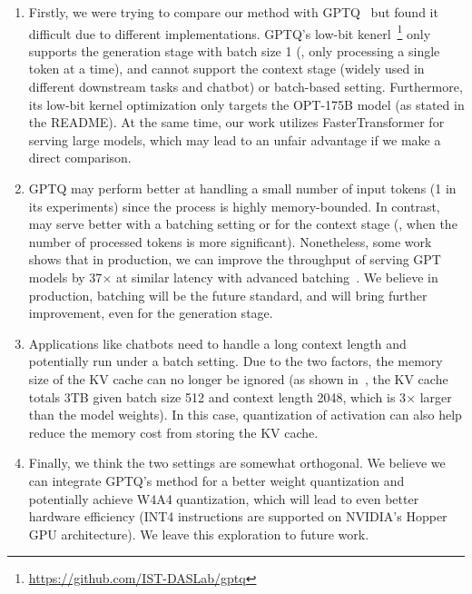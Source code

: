 \begin{enumerate}
    \item Firstly, we were trying to compare our method with GPTQ~\cite{frantar2022gptq} but found it difficult due to different implementations. GPTQ's low-bit kenerl~\footnote{\url{https://github.com/IST-DASLab/gptq}} only supports the generation stage with batch size 1 (\ie, only processing a single token at a time), and cannot support the context stage (widely used in different downstream tasks and chatbot) or batch-based setting. Furthermore, its low-bit kernel optimization only targets the OPT-175B model (as stated in the README). At the same time, our work utilizes FasterTransformer for serving large models, which may lead to an unfair advantage if we make a direct comparison.
    \item GPTQ may perform better at handling a small number of input tokens (1 in its experiments) since the process is highly memory-bounded. In contrast, \method may serve better with a batching setting or for the context stage (\ie, when the number of processed tokens is more significant). Nonetheless, some work shows that in production, we can improve the throughput of serving GPT models by 37$\times$ at similar latency with advanced batching~\cite{yu2022orca}. We believe in production, batching will be the future standard, and \method will bring further improvement, even for the generation stage. 
    \item Applications like chatbots need to handle a long context length and potentially run under a batch setting. Due to the two factors, the memory size of the KV cache can no longer be ignored (as shown in~\cite{pope2022efficiently}, the KV cache totals 3TB given batch size 512 and context length 2048, which is 3$\times$ larger than the model weights). In this case, quantization of activation can also help reduce the memory cost from storing the KV cache.  
    \item Finally, we think the two settings are somewhat orthogonal. We believe we can integrate GPTQ's method for a better weight quantization and potentially achieve W4A4 quantization, which will lead to even better hardware efficiency (INT4 instructions are supported on NVIDIA's Hopper GPU architecture). We leave this exploration to future work.
\end{enumerate}

